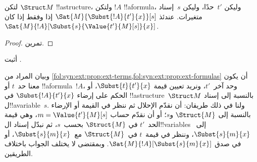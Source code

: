 \documentclass[../../../include/open-logic-section]{subfiles}
\begin{document}
\begin{prop} لتكن $\Struct M$
!!a{structure}، ولتكن $!A$ !!a{formula}، وليكن $t'$~حدًا، وليكن
$s$~إسناد متغيرات. عندئذ
$\Sat{M}{\Subst{!A}{t'}{x}}[s]$ إذا وفقط إذا كان
$\Sat{M}{!A}[\Subst{s}{\Value{t'}{M}[s]}{x}]$.
\end{prop}

\begin{proof}
تمرين.
\end{proof}

\begin{prob}
أثبت .
\end{prob}

\begin{explain}
  وبيان المراد من
  \cref{fol:syn:ext:prop:ext-terms,fol:syn:ext:prop:ext-formulas}
  أن يكون معنا حد~$t$ أو !!a{formula}~$!A$، وحد آخر~$t'$،
  ونريد تعيين قيمة $\Subst{t}{t'}{x}$، أو الحكم على إرضاء
  $\Subst{!A}{t'}{x}$ في !!a{structure}~$\Struct M$
  بالنسبة إلى إسناد ل!!a{variable}~$s$. ولنا في ذلك طريقان:
  أن نقدّم الإحلال ثم ننظر في القيمة أو الإرضاء بالنسبة إلى
  $\Struct{M}$ و$s$؛ أو أن نقدّم حساب
  $m = \Value{t'}{M}[s]$، وهي قيمة الحد~$t'$ في
  $\Struct{M}$ بحسب~$s$، ثم نبدّل إسناد ال!!{variable}s
  إلى~$\Subst{s}{m}{x}$، وننظر في قيمة~$t$ في~$\Struct{M}$
  مع~$\Subst{s}{m}{x}$، أو في صدق
  $\Sat{M}{!A}[\Subst{s}{m}{x}]$.
  وبمقتضى 
  لا يختلف الجواب باختلاف الطريقين.
\end{explain}
\end{document}
